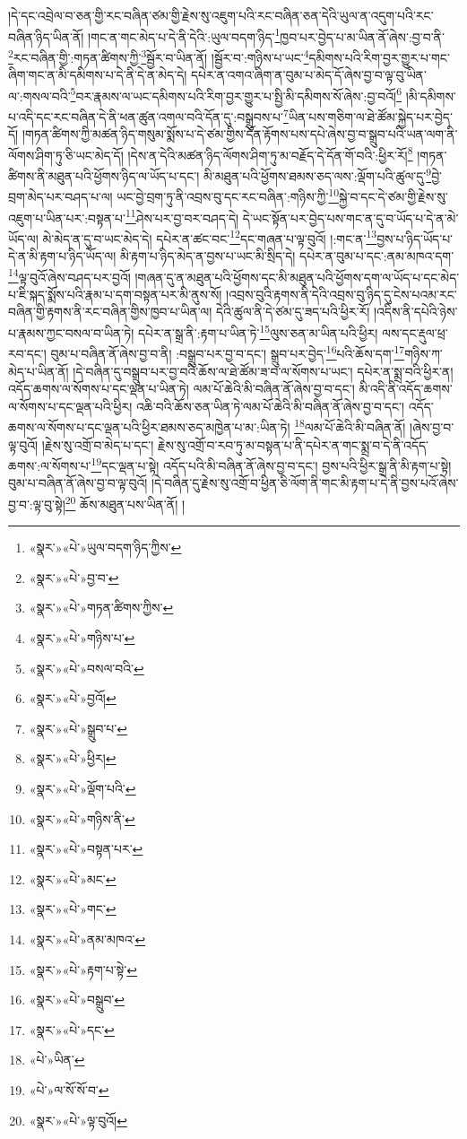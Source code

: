 །དེ་དང་འབྲེལ་བ་ཅན་གྱི་རང་བཞིན་ཙམ་གྱི་རྗེས་སུ་འཇུག་པའི་རང་བཞིན་ཅན་དེའི་ཡུལ་ན་འདུག་པའི་རང་བཞིན་ཉིད་ཡིན་ནོ། །གང་ན་གང་མེད་པ་དེ་ནི་དེའི་:ཡུལ་བདག་ཉིད་\footnote{«སྣར་»«པེ་»ཡུལ་བདག་ཉིད་ཀྱིས་}ཁྱབ་པར་བྱེད་པ་མ་ཡིན་ནོ་ཞེས་:བྱ་བ་ནི་\footnote{«སྣར་»«པེ་»བྱ་བ་}རང་བཞིན་གྱི་:གཏན་ཚིགས་ཀྱི་\footnote{«སྣར་»«པེ་»གཏན་ཚིགས་ཀྱིས་}སྦྱོར་བ་ཡིན་ནོ། །སྦྱོར་བ་:གཉིས་པ་ཡང་\footnote{«སྣར་»«པེ་»གཉིས་པ་}དམིགས་པའི་རིག་བྱར་གྱུར་པ་གང་ཞིག་གང་ན་མི་དམིགས་པ་དེ་ནི་དེ་ན་མེད་དེ། དཔེར་ན་འགའ་ཞིག་ན་བུམ་པ་མེད་དོ་ཞེས་བྱ་བ་ལྟ་བུ་ཡིན་ལ་:གསལ་བའི་\footnote{«སྣར་»«པེ་»བསལ་བའི་}བར་རྣམས་ལ་ཡང་དམིགས་པའི་རིག་བྱར་གྱུར་པ་སྤྱི་མི་དམིགས་སོ་ཞེས་:བྱ་བའོ།\footnote{«སྣར་»«པེ་»བྱའོ།} །མི་དམིགས་པ་འདི་དང་རང་བཞིན་དེ་ནི་ཕན་ཚུན་འགལ་བའི་དོན་དུ་:བསྒྲུབས་པ་\footnote{«སྣར་»«པེ་»སྒྲུབ་པ་}ཡིན་པས་གཅིག་ལ་ཐེ་ཚོམ་སྐྱེད་པར་བྱེད་དོ། །གཏན་ཚིགས་ཀྱི་མཚན་ཉིད་གསུམ་སྨོས་པ་དེ་ཙམ་གྱིས་དོན་རྟོགས་པས་དཔེ་ཞེས་བྱ་བ་སྒྲུབ་པའི་ཡན་ལག་ནི་ལོགས་ཤིག་ཏུ་ཅི་ཡང་མེད་དོ། །དེས་ན་དེའི་མཚན་ཉིད་ལོགས་ཤིག་ཏུ་མ་བརྗོད་དེ་དོན་གོ་བའི་:ཕྱིར་རོ།\footnote{«སྣར་»«པེ་»ཕྱིར།} །གཏན་ཚིགས་ནི་མཐུན་པའི་ཕྱོགས་ཉིད་ལ་ཡོད་པ་དང་། མི་མཐུན་པའི་ཕྱོགས་ཐམས་ཅད་ལས་:ལྡོག་པའི་ཚུལ་དུ་\footnote{«སྣར་»«པེ་»ལྡོག་པའི་}བྱེ་བྲག་མེད་པར་བཤད་པ་ལ། ཡང་བྱེ་བྲག་ཏུ་ནི་འབྲས་བུ་དང་རང་བཞིན་:གཉིས་ཀྱི་\footnote{«སྣར་»«པེ་»གཉིས་ནི་}སྐྱེ་བ་དང་དེ་ཙམ་གྱི་རྗེས་སུ་འཇུག་པ་ཡིན་པར་:བསྟན་པ་\footnote{«སྣར་»«པེ་»བསྟན་པར་}ཤེས་པར་བྱ་བར་བཤད་དེ། དེ་ཡང་སྟོན་པར་བྱེད་པས་གང་ན་དུ་བ་ཡོད་པ་དེ་ན་མེ་ཡོད་ལ། མེ་མེད་ན་དུ་བ་ཡང་མེད་དེ། དཔེར་ན་ཚང་བང་\footnote{«སྣར་»«པེ་»མང་}དང་གཞན་པ་ལྟ་བུའོ། །:གང་ན་\footnote{«སྣར་»«པེ་»གང་}བྱས་པ་ཉིད་ཡོད་པ་དེ་ན་མི་རྟག་པ་ཉིད་ཡོད་ལ། མི་རྟག་པ་ཉིད་མེད་ན་བྱས་པ་ཡང་མི་སྲིད་དེ། དཔེར་ན་བུམ་པ་དང་:ནམ་མཁའ་དག་\footnote{«སྣར་»«པེ་»ནམ་མཁའ་}ལྟ་བུའོ་ཞེས་བཤད་པར་བྱའོ། །གཞན་དུ་ན་མཐུན་པའི་ཕྱོགས་དང་མི་མཐུན་པའི་ཕྱོགས་དག་ལ་ཡོད་པ་དང་མེད་པ་ཇི་སྐད་སྨོས་པའི་རྣམ་པ་དག་བསྟན་པར་མི་ནུས་སོ། །འབྲས་བུའི་རྟགས་ནི་དེའི་འབྲས་བུ་ཉིད་དུ་ངེས་པའམ་རང་བཞིན་གྱི་རྟགས་ནི་རང་བཞིན་གྱིས་ཁྱབ་པ་ཡིན་ལ། དེའི་ཚུལ་ནི་དེ་ཙམ་དུ་ཟད་པའི་ཕྱིར་རོ། །འདིས་ནི་དཔེའི་ཉེས་པ་རྣམས་ཀྱང་བསལ་བ་ཡིན་ཏེ། དཔེར་ན་སྒྲ་ནི་:རྟག་པ་ཡིན་ཏེ་\footnote{«སྣར་»«པེ་»རྟག་པ་སྟེ་}ལུས་ཅན་མ་ཡིན་པའི་ཕྱིར། ལས་དང་རྡུལ་ཕྲ་རབ་དང་། བུམ་པ་བཞིན་ནོ་ཞེས་བྱ་བ་ནི། :བསྒྲུབ་པར་བྱ་བ་དང་། སྒྲུབ་པར་བྱེད་\footnote{«སྣར་»«པེ་»བསྒྲུབ་}པའི་ཆོས་དག་\footnote{«སྣར་»«པེ་»དང་}གཉིས་ཀ་མེད་པ་ཡིན་ནོ། །དེ་བཞིན་དུ་བསྒྲུབ་པར་བྱ་བའི་ཆོས་ལ་ཐེ་ཚོམ་ཟ་བ་ལ་སོགས་པ་ཡང་། དཔེར་ན་སྨྲ་བའི་ཕྱིར་ན། འདོད་ཆགས་ལ་སོགས་པ་དང་ལྡན་པ་ཡིན་ཏེ། ལམ་པོ་ཆེའི་མི་བཞིན་ནོ་ཞེས་བྱ་བ་དང་། མི་འདི་ནི་འདོད་ཆགས་ལ་སོགས་པ་དང་ལྡན་པའི་ཕྱིར། འཆི་བའི་ཆོས་ཅན་ཡིན་ཏེ་ལམ་པོ་ཆེའི་མི་བཞིན་ནོ་ཞེས་བྱ་བ་དང་། འདོད་ཆགས་ལ་སོགས་པ་དང་ལྡན་པའི་ཕྱིར་ཐམས་ཅད་མཁྱེན་པ་མ་:ཡིན་ཏེ། \footnote{«པེ་»ཡིན་}ལམ་པོ་ཆེའི་མི་བཞིན་ནོ། །ཞེས་བྱ་བ་ལྟ་བུའོ། །རྗེས་སུ་འགྲོ་བ་མེད་པ་དང་། རྗེས་སུ་འགྲོ་བ་རབ་ཏུ་མ་བསྟན་པ་ནི་དཔེར་ན་གང་སྨྲ་བ་དེ་ནི་འདོད་ཆགས་:ལ་སོགས་པ་\footnote{«པེ་»ལ་སོ་སོ་བ་}དང་ལྡན་པ་སྟེ། འདོད་པའི་མི་བཞིན་ནོ་ཞེས་བྱ་བ་དང་། བྱས་པའི་ཕྱིར་སྒྲ་ནི་མི་རྟག་པ་སྟེ། བུམ་པ་བཞིན་ནོ་ཞེས་བྱ་བ་ལྟ་བུའོ། །དེ་བཞིན་དུ་རྗེས་སུ་འགྲོ་བ་ཕྱིན་ཅི་ལོག་ནི་གང་མི་རྟག་པ་དེ་ནི་བྱས་པའོ་ཞེས་བྱ་བ་:ལྟ་བུ་སྟེ།\footnote{«སྣར་»«པེ་»ལྟ་བུའོ།} ཆོས་མཐུན་པས་ཡིན་ནོ། །
